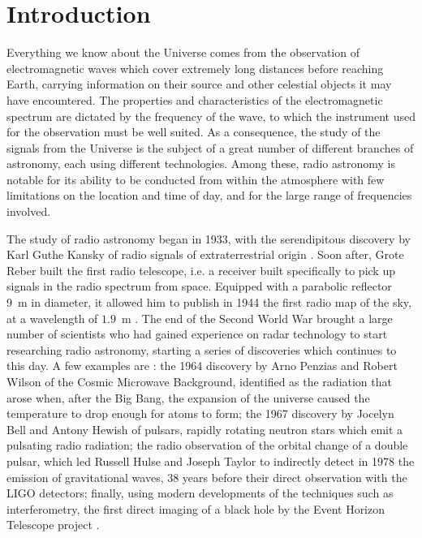\section{Introduction}
Everything we know about the Universe comes from the observation of electromagnetic waves which cover extremely long distances before reaching Earth, carrying information on their source and other celestial objects it may have encountered.
The properties and characteristics of the electromagnetic spectrum are dictated by the frequency of the wave, to which the instrument used for the observation must be well suited. 
As a consequence, the study of the signals from the Universe is the subject of a great number of different branches of astronomy, each using different technologies. Among these, radio astronomy is notable {for its ability to be conducted} from within the atmosphere with few limitations on the location and time of day, and for the large range of frequencies involved.

The study of radio astronomy began in 1933, with the serendipitous discovery by Karl Guthe Kansky of radio signals of extraterrestrial origin \cite{condon_essential_2016}. 
Soon after, Grote Reber built the first radio telescope, i.e. a {receiver} built specifically to {pick up} signals in the radio spectrum from space. Equipped with a parabolic reflector \mbox{9 m} in diameter, it allowed him to publish in 1944 the first radio map of the sky, at a wavelength of \mbox{$1.9$ m} \cite{lauterbach_radio_2022}.
The end of the Second World War brought a large number of scientists who had gained experience on radar technology to start researching radio astronomy, starting a series of discoveries which continues to this day.
A few examples are \cite{lauterbach_radio_2022}: 
the 1964 discovery by Arno Penzias and Robert Wilson of the Cosmic Microwave Background, identified as the radiation that arose when, after the Big Bang, the expansion of the universe caused the temperature to drop enough for atoms to form;
the 1967 discovery by Jocelyn Bell and Antony Hewish of pulsars, rapidly rotating neutron stars which emit a pulsating radio radiation; 
the radio observation of the orbital change of a double pulsar, which led Russell Hulse and Joseph Taylor to indirectly detect in 1978 the emission of gravitational waves, 38 years before their direct observation with the LIGO detectors;
finally, using modern developments of the techniques such as interferometry, the first direct imaging of a black hole by the Event Horizon Telescope project \cite{the_event_horizon_telescope_collaboration_first_2019}. 

